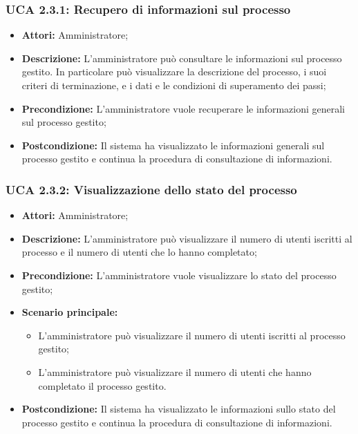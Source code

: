 \hypertarget{A2.3.1}{}
\subsubsection{UCA 2.3.1: Recupero di informazioni sul processo}
\begin{itemize}
\item \textbf{Attori:}
 Amministratore;
\item \textbf{Descrizione:} 
L'amministratore può consultare le informazioni sul processo gestito. In particolare può visualizzare la descrizione del processo, i suoi criteri di terminazione, e i dati e le condizioni di superamento dei passi; 
\item \textbf{Precondizione:} 
L'amministratore vuole recuperare le informazioni generali sul processo gestito;
\item \textbf{Postcondizione:} 
Il sistema ha visualizzato le informazioni generali sul processo gestito e continua la procedura di consultazione di informazioni.
\end{itemize}

\hypertarget{A2.3.2}{}
\subsubsection{UCA 2.3.2: Visualizzazione dello stato del processo}
\begin{itemize}
\item \textbf{Attori:}
 Amministratore;
\item \textbf{Descrizione:} 
L'amministratore può visualizzare il numero di utenti iscritti al processo e il numero di utenti che lo hanno completato; 
\item \textbf{Precondizione:} 
L'amministratore vuole visualizzare lo stato del processo gestito;
\item \textbf{Scenario principale:} 
\begin{itemize}
\item L'amministratore può visualizzare il numero di utenti iscritti al processo gestito;
\item L'amministratore può visualizzare il numero di utenti che hanno completato il processo gestito.
\end{itemize}
\item \textbf{Postcondizione:} 
Il sistema ha visualizzato le informazioni sullo stato del processo gestito e continua la procedura di consultazione di informazioni.
\end{itemize}

